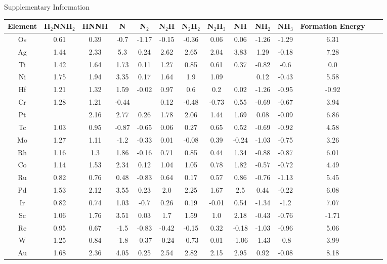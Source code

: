 Supplementary Information
\onecolumn
\begin{table}
\begin{center}
\begin{tabular}{| c | c | c | c | c | c | c | c | c | c | c | c | c | c |}
\hline
Element & H$_2$NNH$_2$ & HNNH & N & N$_2$ & N$_2$H & N$_2$H$_2$ & N$_2$H$_3$ & NH & NH$_2$ & NH$_3$ & Formation Energy\\
\hline

Os & 0.61 & 0.39 & -0.7 & -1.17 & -0.15 & -0.36 & 0.06 & 0.06 & -1.26 & -1.29 & 6.31 \\
Ag & 1.44 & 2.33 & 5.3 & 0.24 & 2.62 & 2.65 & 2.04 & 3.83 & 1.29 & -0.18 & 7.28 \\
Ti & 1.42 & 1.64 & 1.73 & 0.11 & 1.27 & 0.85 & 0.61 & 0.37 & -0.82 & -0.6 & 0.0 \\
Ni & 1.75 & 1.94 & 3.35 & 0.17 & 1.64 & 1.9 & 1.09 &  & 0.12 & -0.43 & 5.58 \\
Hf & 1.21 & 1.32 & 1.59 & -0.02 & 0.97 & 0.6 & 0.2 & 0.02 & -1.26 & -0.95 & -0.92 \\
Cr & 1.28 & 1.21 & -0.44 &  & 0.12 & -0.48 & -0.73 & 0.55 & -0.69 & -0.67 & 3.94 \\
Pt &  & 2.16 & 2.77 & 0.26 & 1.78 & 2.06 & 1.44 & 1.69 & 0.08 & -0.09 & 6.86 \\
Tc & 1.03 & 0.95 & -0.87 & -0.65 & 0.06 & 0.27 & 0.65 & 0.52 & -0.69 & -0.92 & 4.58 \\
Mo & 1.27 & 1.11 & -1.2 & -0.33 & 0.01 & -0.08 & 0.39 & -0.24 & -1.03 & -0.75 & 3.26 \\
Rh & 1.16 & 1.3 & 1.86 & -0.16 & 0.71 & 0.85 & 0.44 & 1.34 & -0.88 & -0.87 & 6.01 \\
Co & 1.14 & 1.53 & 2.34 & 0.12 & 1.04 & 1.05 & 0.78 & 1.82 & -0.57 & -0.72 & 4.49 \\
Ru & 0.82 & 0.76 & 0.48 & -0.83 & 0.64 & 0.17 & 0.57 & 0.86 & -0.76 & -1.13 & 5.45 \\
Pd & 1.53 & 2.12 & 3.55 & 0.23 & 2.0 & 2.25 & 1.67 & 2.5 & 0.44 & -0.22 & 6.08 \\
Ir & 0.82 & 0.74 & 1.03 & -0.7 & 0.26 & 0.19 & -0.01 & 0.54 & -1.34 & -1.2 & 7.07 \\
Sc & 1.06 & 1.76 & 3.51 & 0.03 & 1.7 & 1.59 & 1.0 & 2.18 & -0.43 & -0.76 & -1.71 \\
Re & 0.95 & 0.67 & -1.5 & -0.83 & -0.42 & -0.15 & 0.32 & -0.18 & -1.03 & -0.96 & 5.06 \\
W & 1.25 & 0.84 & -1.8 & -0.37 & -0.24 & -0.73 & 0.01 & -1.06 & -1.43 & -0.8 & 3.99 \\
Au & 1.68 & 2.36 & 4.05 & 0.25 & 2.54 & 2.82 & 2.15 & 2.95 & 0.92 & -0.08 & 8.18 \\

\end{tabular}
\end{center}
\end{table}
